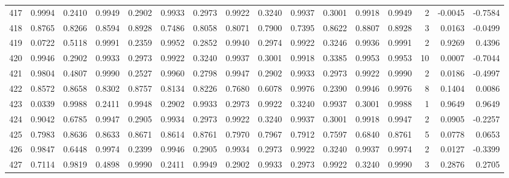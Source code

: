 \begin{tabular}{lrrrrrrrrrrrrrrr}
417 &      0.9994 &  0.2410 &  0.9949 &  0.2902 &  0.9933 &  0.2973 &  0.9922 &  0.3240 &  0.9937 &  0.3001 &   0.9918 &     0.9949 &      2 &                   -0.0045 &                    -0.7584 \\
418 &      0.8765 &  0.8266 &  0.8594 &  0.8928 &  0.7486 &  0.8058 &  0.8071 &  0.7900 &  0.7395 &  0.8622 &   0.8807 &     0.8928 &      3 &                    0.0163 &                    -0.0499 \\
419 &      0.0722 &  0.5118 &  0.9991 &  0.2359 &  0.9952 &  0.2852 &  0.9940 &  0.2974 &  0.9922 &  0.3246 &   0.9936 &     0.9991 &      2 &                    0.9269 &                     0.4396 \\
420 &      0.9946 &  0.2902 &  0.9933 &  0.2973 &  0.9922 &  0.3240 &  0.9937 &  0.3001 &  0.9918 &  0.3385 &   0.9953 &     0.9953 &     10 &                    0.0007 &                    -0.7044 \\
421 &      0.9804 &  0.4807 &  0.9990 &  0.2527 &  0.9960 &  0.2798 &  0.9947 &  0.2902 &  0.9933 &  0.2973 &   0.9922 &     0.9990 &      2 &                    0.0186 &                    -0.4997 \\
422 &      0.8572 &  0.8658 &  0.8302 &  0.8757 &  0.8134 &  0.8226 &  0.7680 &  0.6078 &  0.9976 &  0.2390 &   0.9946 &     0.9976 &      8 &                    0.1404 &                     0.0086 \\
423 &      0.0339 &  0.9988 &  0.2411 &  0.9948 &  0.2902 &  0.9933 &  0.2973 &  0.9922 &  0.3240 &  0.9937 &   0.3001 &     0.9988 &      1 &                    0.9649 &                     0.9649 \\
424 &      0.9042 &  0.6785 &  0.9947 &  0.2905 &  0.9934 &  0.2973 &  0.9922 &  0.3240 &  0.9937 &  0.3001 &   0.9918 &     0.9947 &      2 &                    0.0905 &                    -0.2257 \\
425 &      0.7983 &  0.8636 &  0.8633 &  0.8671 &  0.8614 &  0.8761 &  0.7970 &  0.7967 &  0.7912 &  0.7597 &   0.6840 &     0.8761 &      5 &                    0.0778 &                     0.0653 \\
426 &      0.9847 &  0.6448 &  0.9974 &  0.2399 &  0.9946 &  0.2905 &  0.9934 &  0.2973 &  0.9922 &  0.3240 &   0.9937 &     0.9974 &      2 &                    0.0127 &                    -0.3399 \\
427 &      0.7114 &  0.9819 &  0.4898 &  0.9990 &  0.2411 &  0.9949 &  0.2902 &  0.9933 &  0.2973 &  0.9922 &   0.3240 &     0.9990 &      3 &                    0.2876 &                     0.2705 \\

\end{tabular}
